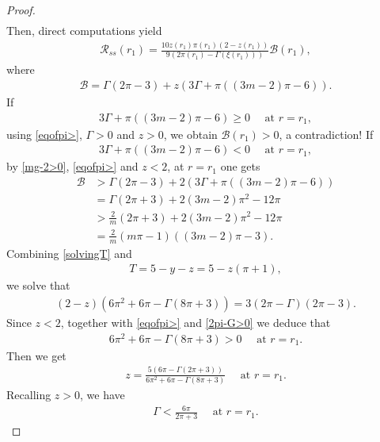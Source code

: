 \documentclass{article}
\theoremstyle{definition} \theoremstyle{remark}
\numberwithin{equation}{section}
\newcommand{\cR}{\mathcal{R}}
\begin{document}
\begin{proof}
\begin{align}
		\end{align}
		Then, direct computations yield
		\begin{align*}
			\cR_{ss}(r_1) = \frac{10z(r_1)\pi(r_1)(2-z(r_1))}{9(2\pi(r_1) - \Gamma(\xi(r_1)))}\mathcal{B}(r_1),
		\end{align*}
		where
		\begin{align*}
			\mathcal{B} = \Gamma(2\pi - 3) + z \left(3\Gamma + \pi\left((3m-2)\pi - 6\right)\right).
		\end{align*}
If
		\begin{align*}
			3\Gamma + \pi\left((3m-2)\pi - 6\right) \ge 0 \quad \text{ at } r = r_1,
		\end{align*}
		using \eqref{eqofpi>}, $\Gamma > 0$ and $z > 0$, we obtain $\mathcal{B}(r_1) > 0$, a contradiction! If
		\begin{align*}
			3\Gamma + \pi\left((3m-2)\pi - 6\right) < 0 \quad \text{ at } r = r_1,
		\end{align*}
		by \eqref{mg-2>0}, \eqref{eqofpi>} and $z < 2$, at $r = r_1$ one gets
		\begin{align} \label{B1}
			\mathcal{B} & > \Gamma(2\pi - 3) + 2\left(3\Gamma + \pi\left((3m-2)\pi - 6\right)\right) \\
			& = \Gamma(2\pi + 3) + 2(3m-2)\pi^2 - 12\pi \\
			& > \frac{2}{m}(2\pi + 3) + 2(3m-2)\pi^2 - 12\pi \\
			&= \frac{2}{m}(m\pi - 1)\left((3m-2)\pi - 3\right).
		\end{align}
		Combining \eqref{solvingT} and
		\begin{align*}
			T = 5 - y - z = 5 - z(\pi + 1),
		\end{align*}
		we solve that
		\begin{align*}
			(2-z)\left(6\pi^2 + 6\pi - \Gamma(8\pi + 3)\right) = 3(2\pi - \Gamma)(2\pi - 3).
		\end{align*}
		Since $z < 2$, together with \eqref{eqofpi>} and \eqref{2pi-G>0} we deduce that
		\begin{align*}
			6\pi^2 + 6\pi - \Gamma(8\pi + 3) > 0 \quad \text{ at } r = r_1.
		\end{align*}
		Then we get
		\begin{align*}
			z = \frac{5\left(6\pi - \Gamma(2\pi + 3)\right)}{6\pi^2 + 6\pi - \Gamma(8\pi + 3)} \quad \text{ at } r = r_1.
		\end{align*}
		Recalling $z > 0$, we have
		\begin{align*}
			\Gamma < \frac{6\pi}{2\pi + 3} \quad \text{ at } r = r_1.

\end{align*}
\end{proof}
\end{document}
